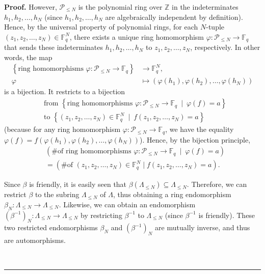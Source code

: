 \documentclass[numbers=enddot,12pt,final,onecolumn,notitlepage]{scrartcl}%
\theoremstyle{definition}
\newenvironment{proof}[1][Proof]{\noindent\textbf{#1.} }{\ \rule{0.5em}{0.5em}}
\renewcommand{\leq}{\leqslant}
\theoremstyle{plainsl}
\begin{document}
\begin{proof}
However, $\mathcal{P}_{\leq N}$ is the polynomial ring over $\mathbb{Z}$ in
the indeterminates $h_{1},h_{2},\ldots,h_{N}$ (since $h_{1},h_{2},\ldots
,h_{N}$ are algebraically independent by definition). Hence, by the universal
property of polynomial rings, for each $N$-tuple $\left(  z_{1},z_{2}%
,\ldots,z_{N}\right)  \in\mathbb{F}_{q}^{N}$, there exists a unique ring
homomorphism $\varphi:\mathcal{P}_{\leq N}\rightarrow\mathbb{F}_{q}$ that
sends these indeterminates $h_{1},h_{2},\ldots,h_{N}$ to $z_{1},z_{2}%
,\ldots,z_{N}$, respectively. In other words, the map%
\begin{align*}
\left\{  \text{ring homomorphisms }\varphi:\mathcal{P}_{\leq N}\rightarrow
\mathbb{F}_{q}\right\}    & \rightarrow\mathbb{F}_{q}^{N},\\
\varphi & \mapsto\left(  \varphi\left(  h_{1}\right)  ,\varphi\left(
h_{2}\right)  ,\ldots,\varphi\left(  h_{N}\right)  \right)
\end{align*}
is a bijection. It restricts to a bijection
\begin{align*}
& \text{from }\left\{  \text{ring homomorphisms }\varphi:\mathcal{P}_{\leq
N}\rightarrow\mathbb{F}_{q}\ \mid\ \varphi\left(  f\right)  =a\right\}  \\
& \text{to }\left\{  \left(  z_{1},z_{2},\ldots,z_{N}\right)  \in
\mathbb{F}_{q}^{N}\ \mid\ f\left(  z_{1},z_{2},\ldots,z_{N}\right)
=a\right\}
\end{align*}
(because for any ring homomorphism $\varphi:\mathcal{P}_{\leq N}%
\rightarrow\mathbb{F}_{q}$, we have the equality
$\varphi\left(  f\right)  =f\left(
\varphi\left(  h_{1}\right)  ,\varphi\left(  h_{2}\right)  ,\ldots
,\varphi\left(  h_{N}\right)  \right)  $). Hence, by the bijection principle,%
\begin{align}
& \left(  \text{\# of ring homomorphisms }\varphi:\mathcal{P}_{\leq
N}\rightarrow\mathbb{F}_{q}\ \mid\ \varphi\left(  f\right)  =a\right)
\nonumber\\
& =\left(  \text{\# of }\left(  z_{1},z_{2},\ldots,z_{N}\right)  \in
\mathbb{F}_{q}^{N}\mid f\left(  z_{1},z_{2},\ldots,z_{N}\right)  =a\right)
.\label{pf.prop.friendly-aut.1}%
\end{align}


Since $\beta$ is friendly, it is easily seen that $\beta\left(  \Lambda_{\leq
N}\right)  \subseteq\Lambda_{\leq N}$. Therefore, we can restrict $\beta$ to
the subring $\Lambda_{\leq N}$ of $\Lambda$, thus obtaining a ring
endomorphism $\beta_{N}:\Lambda_{\leq N}\rightarrow\Lambda_{\leq N}$.
Likewise, we can obtain an endomorphism $\left(  \beta^{-1}\right)
_{N}:\Lambda_{\leq N}\rightarrow\Lambda_{\leq N}$ by restricting $\beta^{-1}$
to $\Lambda_{\leq N}$ (since $\beta^{-1}$ is friendly). These two restricted
endomorphisms $\beta_{N}$ and $\left(  \beta^{-1}\right)  _{N}$ are mutually
inverse, and thus are automorphisms.


\end{proof}
\end{document}
